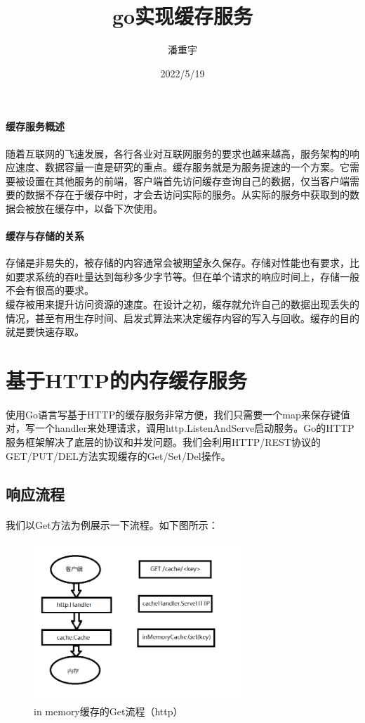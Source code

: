 \documentclass{article}
\title{go实现缓存服务}
\author{潘重宇}
\date{2022/5/19}
\begin{document}
	\maketitle
	\newpage
	\paragraph{缓存服务概述}
	随着互联网的飞速发展，各行各业对互联网服务的要求也越来越高，服务架构的响应速度、数据容量一直是研究的重点。缓存服务就是为服务提速的一个方案。它需要被设置在其他服务的前端，客户端首先访问缓存查询自己的数据，仅当客户端需要的数据不存在于缓存中时，才会去访问实际的服务。从实际的服务中获取到的数据会被放在缓存中，以备下次使用。
	\paragraph{缓存与存储的关系}
	存储是非易失的，被存储的内容通常会被期望永久保存。存储对性能也有要求，比如要求系统的吞吐量达到每秒多少字节等。但在单个请求的响应时间上，存储一般不会有很高的要求。
	\\
	缓存被用来提升访问资源的速度。在设计之初，缓存就允许自己的数据出现丢失的情况，甚至有用生存时间、启发式算法来决定缓存内容的写入与回收。缓存的目的就是要快速存取。
	\section{基于HTTP的内存缓存服务}
	\paragraph{}
	使用Go语言写基于HTTP的缓存服务非常方便，我们只需要一个map来保存键值对，写一个handler来处理请求，调用http.ListenAndServe启动服务。Go的HTTP服务框架解决了底层的协议和并发问题。我们会利用HTTP/REST协议的GET/PUT/DEL方法实现缓存的Get/Set/Del操作。
	\subsection{响应流程}
	\paragraph{}
	我们以Get方法为例展示一下流程。如下图所示：
	\begin{figure}[h]
		\caption{in memory缓存的Get流程（http）}
		\centering
		\includegraphics[width=8cm, height=6cm]{httpGet.png}
	\end{figure}
\end{document}
